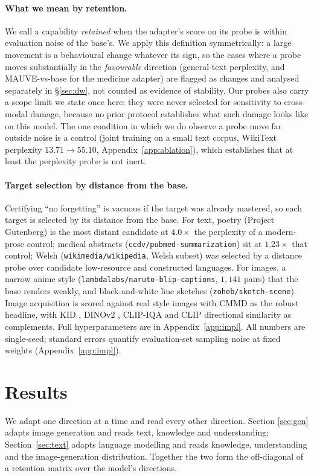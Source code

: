 \documentclass{article}
\begin{document}
\paragraph{What we mean by retention.}
We call a capability \emph{retained} when the adapter's score on its probe is
within evaluation noise of the base's. We apply this definition symmetrically:
a large movement is a behavioural change whatever its sign, so the cases where a
probe moves substantially in the \emph{favourable} direction (general-text
perplexity, and MAUVE-vs-base for the medicine adapter) are flagged as changes
and analysed separately in \S\ref{sec:dw}, not counted as evidence of stability.
Our probes also carry a scope limit we state once here: they were never selected
for sensitivity to cross-modal damage, because no prior protocol establishes what
such damage looks like on this model. The one condition in which we do observe a
probe move far outside noise is a control (joint training on a small text corpus,
WikiText perplexity $13.71\!\to\!55.10$, Appendix~\ref{app:ablation}), which
establishes that at least the perplexity probe is not inert.

\paragraph{Target selection by distance from the base.}
Certifying ``no forgetting'' is vacuous if the target was already mastered, so
each target is selected by its distance from the base. For text, poetry (Project
Gutenberg) is the most distant candidate at $4.0\times$ the perplexity of a
modern-prose control; medical abstracts (\texttt{ccdv/pubmed-summarization}) sit
at $1.23\times$ that control; Welsh (\texttt{wikimedia/wikipedia}, Welsh subset)
was selected by a distance probe over candidate low-resource and constructed
languages. For images, a narrow anime style (\texttt{lambdalabs/naruto-blip-captions},
$1{,}141$ pairs) that the base renders weakly, and black-and-white line sketches
(\texttt{zoheb/sketch-scene}). Image acquisition is scored against real style
images with CMMD \citep{cmmd} as the robust headline, with KID \citep{kid},
DINOv2 \citep{dinov2}, CLIP-IQA \citep{clipiqa} and CLIP directional similarity
\citep{stylegannada} as complements. Full hyperparameters are in
Appendix~\ref{app:impl}. All numbers are single-seed; standard errors quantify
evaluation-set sampling noise at fixed weights (Appendix~\ref{app:impl}).

\section{Results}
We adapt one direction at a time and read every other direction. Section
\ref{sec:gen} adapts image generation and reads text, knowledge and
understanding; Section~\ref{sec:text} adapts language modelling and reads
knowledge, understanding and the image-generation distribution. Together the two
form the off-diagonal of a retention matrix over the model's directions.
\end{document}
